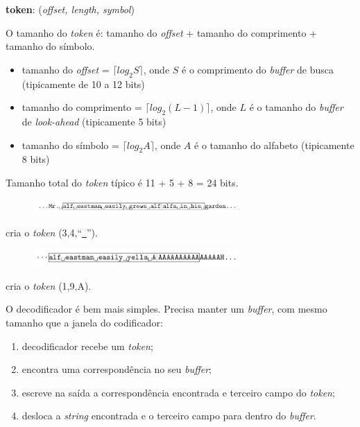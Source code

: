 \begin{frame}[allowframebreaks]
  \framebreak

  \textbf{token}: (\textit{offset, length, symbol})
  
  O tamanho do \textit{token} é: tamanho do \textit{offset} + tamanho do comprimento + tamanho do símbolo.
  
  \begin{itemize}
  \item tamanho do \textit{offset} = $\lceil log_2 S \rceil$, onde $S$ é o comprimento do \textit{buffer} de busca (tipicamente de 10 a 12 bits)
  \item tamanho do comprimento = $\lceil log_2 (L-1) \rceil$, onde $L$ é o tamanho do \textit{buffer} de \textit{look-ahead} (tipicamente 5 bits)
  \item tamanho do símbolo = $\lceil log_2 A \rceil$, onde $A$ é o tamanho do alfabeto (tipicamente 8 bits)
  \end{itemize}

  Tamanho total do \textit{token} típico é 11 + 5 + 8 = 24 bits.

  \framebreak 

  \begin{figure}[h!]
  \centering
  \includegraphics[width=0.7\textwidth]{images/lz77_token_ex01.png}
  \label{fig:lz77_token_ex01}
  \end{figure}
  cria o \textit{token} (3,4,``\underline{\ }'').

  \vspace{2ex}
  \begin{figure}[h!]
  \centering
  \includegraphics[width=0.7\textwidth]{images/lz77_token_ex02.png}
  \label{fig:lz77_token_ex02}
  \end{figure}
  cria o \textit{token} (1,9,A).

  \framebreak

  O decodificador é bem mais simples.
  Precisa manter um \textit{buffer}, com mesmo tamanho que a janela do codificador:
  \begin{enumerate}
  \item decodificador recebe um \textit{token};
  \item encontra uma correspondência no seu \textit{buffer};
  \item escreve na saída a correspondência encontrada e terceiro campo do \textit{token};
  \item desloca a \textit{string} encontrada e o terceiro campo para dentro do \textit{buffer}.
  \end{enumerate}


\end{frame}
